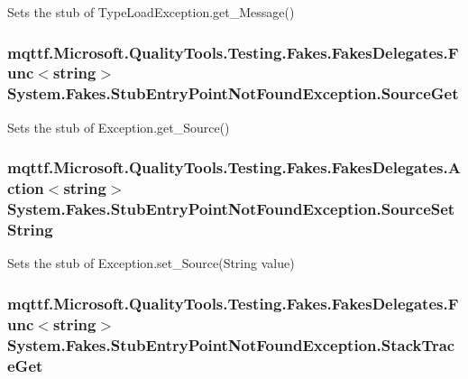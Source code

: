 Sets the stub of Type\-Load\-Exception.\-get\-\_\-\-Message()

\hypertarget{class_system_1_1_fakes_1_1_stub_entry_point_not_found_exception_ad0fa24df51c5d3bea80978b421064594}{
\subsubsection[{Source\-Get}]{\setlength{\rightskip}{0pt plus 5cm}mqttf.\-Microsoft.\-Quality\-Tools.\-Testing.\-Fakes.\-Fakes\-Delegates.\-Func$<$string$>$ System.\-Fakes.\-Stub\-Entry\-Point\-Not\-Found\-Exception.\-Source\-Get}}\label{class_system_1_1_fakes_1_1_stub_entry_point_not_found_exception_ad0fa24df51c5d3bea80978b421064594}


Sets the stub of Exception.\-get\-\_\-\-Source()

\hypertarget{class_system_1_1_fakes_1_1_stub_entry_point_not_found_exception_ac860520e589baea8e9bf24818a107ada}{
\subsubsection[{Source\-Set\-String}]{\setlength{\rightskip}{0pt plus 5cm}mqttf.\-Microsoft.\-Quality\-Tools.\-Testing.\-Fakes.\-Fakes\-Delegates.\-Action$<$string$>$ System.\-Fakes.\-Stub\-Entry\-Point\-Not\-Found\-Exception.\-Source\-Set\-String}}\label{class_system_1_1_fakes_1_1_stub_entry_point_not_found_exception_ac860520e589baea8e9bf24818a107ada}


Sets the stub of Exception.\-set\-\_\-\-Source(\-String value)

\hypertarget{class_system_1_1_fakes_1_1_stub_entry_point_not_found_exception_a720bd2053c8de75152a73d92065945cf}{
\subsubsection[{Stack\-Trace\-Get}]{\setlength{\rightskip}{0pt plus 5cm}mqttf.\-Microsoft.\-Quality\-Tools.\-Testing.\-Fakes.\-Fakes\-Delegates.\-Func$<$string$>$ System.\-Fakes.\-Stub\-Entry\-Point\-Not\-Found\-Exception.\-Stack\-Trace\-Get}}\label{class_system_1_1_fakes_1_1_stub_entry_point_not_found_exception_a720bd2053c8de75152a73d92065945cf}


